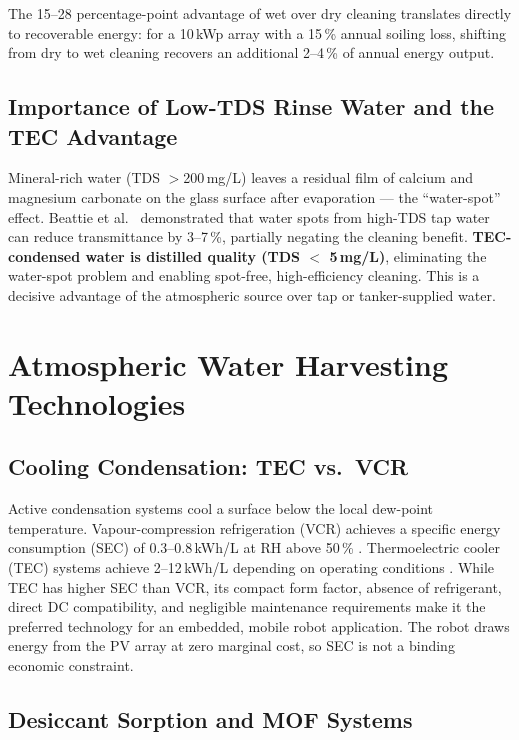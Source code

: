 \documentclass[12pt,a4paper]{report}
\numberwithin{equation}{chapter}
\numberwithin{figure}{chapter}
\numberwithin{table}{chapter}
\begin{document}
\noindent The 15--28 percentage-point advantage of wet over dry cleaning translates
directly to recoverable energy: for a 10\,kWp array with a 15\,\% annual soiling loss,
shifting from dry to wet cleaning recovers an additional 2--4\,\% of annual energy output.

\subsection{Importance of Low-TDS Rinse Water and the TEC Advantage}

Mineral-rich water (TDS $>$200\,mg/L) leaves a residual film of calcium and magnesium
carbonate on the glass surface after evaporation --- the ``water-spot'' effect. Beattie
et al.\ \cite{beattie2012waterspots} demonstrated that water spots from high-TDS tap
water can reduce transmittance by 3--7\,\%, partially negating the cleaning benefit.
\textbf{TEC-condensed water is distilled quality (TDS $<$ 5\,mg/L)}, eliminating the
water-spot problem and enabling spot-free, high-efficiency cleaning. This is a decisive
advantage of the atmospheric source over tap or tanker-supplied water.

\section{Atmospheric Water Harvesting Technologies}

\subsection{Cooling Condensation: TEC vs.\ VCR}

Active condensation systems cool a surface below the local dew-point temperature.
Vapour-compression refrigeration (VCR) achieves a specific energy consumption (SEC) of
0.3--0.8\,kWh/L at RH above 50\,\% \cite{bagheri2024sec}. Thermoelectric cooler (TEC)
systems achieve 2--12\,kWh/L depending on operating conditions
\cite{alqaed2023awg,eslami2021tec}. While TEC has higher SEC than VCR, its compact form
factor, absence of refrigerant, direct DC compatibility, and negligible maintenance
requirements make it the preferred technology for an embedded, mobile robot application.
The robot draws energy from the PV array at zero marginal cost, so SEC is not a binding
economic constraint.

\subsection{Desiccant Sorption and MOF Systems}
\end{document}
